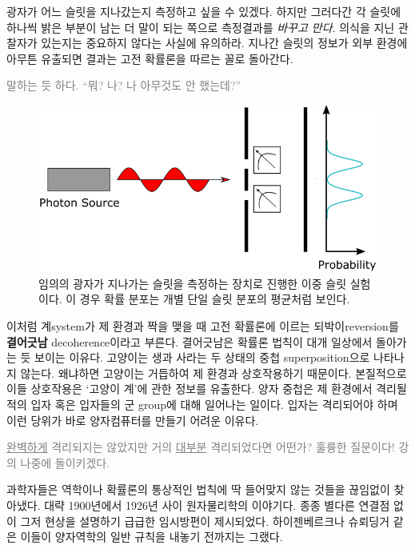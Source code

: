 \documentclass[a4paper,chapter,atbegshi,]{oblivoir}
\begin{document}
\newpage

광자가 어느 슬릿을 지나갔는지 측정하고 싶을 수 있겠다. 하지만 그러다간 각 슬릿에
하나씩 밝은 부분이 남는 더 말이 되는 쪽으로 측정결과를 \emph{바꾸고 만다}. 
의식을 지닌 관찰자가 있는지는 중요하지 않다는 사실에 유의하라. 지나간 슬릿의
정보가 외부 환경에 아무튼 유출되면 결과는 고전 확률론을 따르는 꼴로 돌아간다. 

\hfill

\hfill\parbox[t]{9cm}{\textcolor{gray}{ 말하는 듯 하다. ``뭐? 나? 나 아무것도 안 했는데?''}}

\hfill

\begin{figure}[h]
  \centering
  \includegraphics[width=.8\textwidth]{iqis1_007}
  \caption{\label{fig:figure24}임의의 광자가 지나가는 슬릿을 측정하는 장치로
    진행한 이중 슬릿 실험이다. 이 경우 확률 분포는 개별 단일 슬릿 분포의 평균처럼
  보인다.}
\end{figure}

이처럼 계{\footnotesize system}가 제 환경과 짝을 맺을 때 고전 확률론에 이르는
되박이{\footnotesize reversion}를 \textbf{결어긋남}{\footnotesize
decoherence}이라고 부른다. 결어긋남은 확률론 법칙이 대개 일상에서 돌아가는 듯
보이는 이유다. 고양이는 생과 사라는 두 상태의 중첩{\footnotesize
superposition}으로 나타나지 않는다. 왜냐하면 고양이는 거듭하여 제 환경과
상호작용하기 때문이다. 본질적으로 이들 상호작용은 `고양이 계'에 관한 정보를
유출한다. 양자 중첩은 제 환경에서 격리될 적의 입자 혹은 입자들의 군{\footnotesize
group}에 대해 일어나는 일이다. 입자는 격리되어야 하며 이런 당위가 바로
양자컴퓨터를 만들기 어려운 이유다.

\hfill

\hfill\parbox[t]{9cm}{\textcolor{gray}{ \underline{완벽하게}
격리되지는 않았지만 거의 \underline{대부분} 격리되었다면 어떤가? 훌륭한 질문이다!
강의 나중에 돌이키겠다.}}

\hfill\break

과학자들은 역학이나 확률론의 통상적인 법칙에 딱 들어맞지 않는 것들을 끊임없이
찾아냈다. 대략 1900년에서 1926년 사이 원자물리학의 이야기다. 종종 별다른 연결점
없이 그저 현상을 설명하기 급급한 임시방편이 제시되었다. 하이젠베르크나 슈뢰딩거
같은 이들이 양자역학의 일반 규칙을 내놓기 전까지는 그랬다. 
\end{document}
